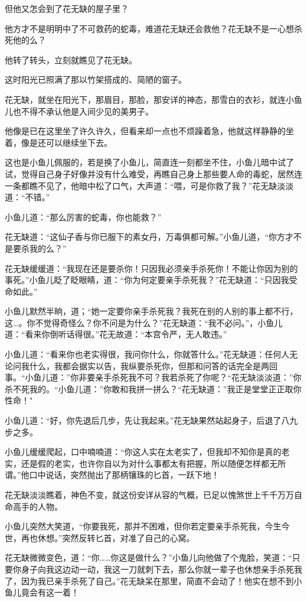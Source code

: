 \documentclass[12pt,oneside]{book}
\begin{document}
但他又怎会到了花无缺的屋子里？

他方才不是明明中了不可救药的蛇毒，难道花无缺还会救他？花无缺不是一心想杀死他的么？

他转了转头，立刻就瞧见了花无缺。

这时阳光已照满了那以竹架搭成的、简陋的窗子。

花无缺，就坐在阳光下，那眉目，那脸，那安详的神态，那雪白的衣衫，就连小鱼儿也不得不承认他是入间少见的美男子。

他像是已在这里坐了许久许久，但看来却一点也不烦躁着急，他就这样静静的坐着，像是还可以继续坐下去。

这也是小鱼儿佩服的，若是换了小鱼儿，简直连一刻都坐不住，小鱼儿暗中试了试，觉得自己身子好像并没有什么难受，再瞧自己身上那些要人命的毒蛇，居然连一条都瞧不见了，他暗中松了口气，大声道：``喂，可是你救了我？''花无缺淡淡道：``不错。''

小鱼儿道：``那么厉害的蛇毒，你也能救？''

花无缺道：``这仙子香与你已服下的素女丹，万毒俱都可解。''小鱼儿道，``你方才不是要杀我的么？''

花无缺缓缓道：``我现在还是要杀你！只因我必须亲手杀死你！不能让你因为别的事死。''小鱼儿眨了眨眼睛，道：``你为何定要亲手杀死我？''花无缺道：``只因我受命如此。''

小鱼儿默然半晌，道；``她一定要你亲手杀死我？我死在别的人别的事上都不行，这\ldots。你不觉得奇怪么？你不问是为什么？''花无缺道：``我不必问。''，小鱼儿道：``看来你倒听话得很。''花无故道：``本宫令严，无人敢违。''

小鱼儿道：``看来你也老实得很，我问你什么，你就答什么。''花无缺道：任何人无论问我什么，我都会据实以告，我纵要杀死你，但那和问答的话完全是两回事。``小鱼儿道：''你非要亲手杀死我不可？我若杀死了你呢？``花无缺淡淡道：''你杀不死我的。``小鱼儿道：''你敢和我拼一拼么？``花无缺道：''我正是堂堂正正取你性命！"

小鱼儿道：``好，你先退后几步，先让我起来。''花无缺果然站起身子，后退了八九步之多。

小鱼儿缓缓爬起，口中喃喃道：``你这人实在太老实了，但我却不知你是真的老实，还是假的老实，也许你自以为对什么事都太有把握，所以随便怎样都无所谓。''他口中说话，突然抛出了那柄镶珠的匕首，一跃下地！

花无缺淡淡瞧着，神色不变，就这份安详从容的气概，已足以愧煞世上千千万万自命高手的人物。

小鱼儿突然大笑道，``你要我死，那并不困难，但你若定要亲手杀死我，今生今世，再也休想。''突然反转匕首，对准了自己的心窝。

花无缺微微变色，道：``你\ldots\ldots 你这是做什么？''小鱼儿向他做了个鬼脸，笑道：``只要你身子向我这边动一动，我这一刀就刺下去，那么你就一辈子也休想亲手杀死我了，因为我已亲手杀死了自己。''花无缺呆在那里，简直不会动了！他实在想不到小鱼儿竟会有这一着！
\end{document}
